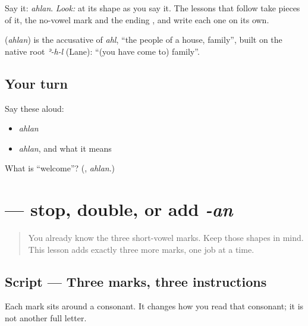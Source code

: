 Say it: \emph{ahlan}. \emph{Look:} at its shape as you say it. The lessons that follow take pieces of it, the no-vowel mark \textbf{} and the ending \textbf{}, and write each one on its own.

\begin{cousinweb}
\textbf{} (\emph{ahlan}) is the accusative of \emph{ahl}, \textquotedblleft{}the people of a house, family\textquotedblright{}, built on the native root \emph{ʾ-h-l} (Lane): \textquotedblleft{}(you have come to) family\textquotedblright{}.
\end{cousinweb}

\subsection*{Your turn}
Say these aloud:

\begin{itemize}
\raggedright
  \item \emph{ahlan}
  \item \emph{ahlan}, and what it means
\end{itemize}

\begin{tcolorbox}[breakable,colback=teal!4,colframe=teal!35!black,title={Before you move on}]
What is \textquotedblleft{}welcome\textquotedblright{}? (\textbf{}, \emph{ahlan}.)
\end{tcolorbox}
\section[\texorpdfstring{\ar{ْ} \ar{ّ} \ar{ً} (sukūn, shadda, fatḥatan)}{ْ ّ ً (sukūn, shadda, fatḥatan)}]{   — stop, double, or add \emph{-an}}

\label{lesson:AR-W06-sukun-shadda-tanwin}



\begin{quote}
You already know the three short-vowel marks. Keep those shapes in mind. This lesson adds exactly three more marks, one job at a time.
\end{quote}

\subsection*{Script — Three marks, three instructions}
Each mark sits around a consonant. It changes how you read that consonant; it is not another full letter.

